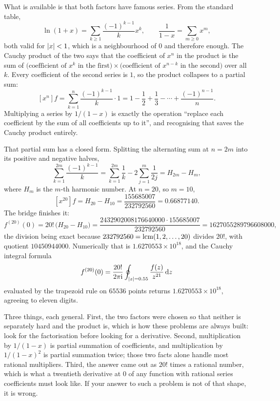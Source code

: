 What is available is that both factors have famous series. From the standard table,
\[
\ln(1+x)=\sum_{k\geq1}\frac{(-1)^{k-1}}{k}x^{k},\qquad \frac{1}{1-x}=\sum_{m\geq0}x^{m},
\]
both valid for $\left\lvert x\right\rvert<1$, which is a neighbourhood of $0$ and therefore enough. The Cauchy product of the two says that the coefficient of $x^{n}$ in the product is the sum of $\bigl(\text{coefficient of }x^{k}\text{ in the first}\bigr)\times\bigl(\text{coefficient of }x^{n-k}\text{ in the second}\bigr)$ over all $k$. Every coefficient of the second series is $1$, so the product collapses to a partial sum:
\[
[x^{n}]f=\sum_{k=1}^{n}\frac{(-1)^{k-1}}{k}\cdot1=1-\frac12+\frac13-\cdots+\frac{(-1)^{n-1}}{n} .
\]
Multiplying a series by $1/(1-x)$ is exactly the operation ``replace each coefficient by the sum of all coefficients up to it'', and recognising that saves the Cauchy product entirely.

That partial sum has a closed form. Splitting the alternating sum at $n=2m$ into its positive and negative halves,
\[
\sum_{k=1}^{2m}\frac{(-1)^{k-1}}{k}=\sum_{k=1}^{2m}\frac1k-2\sum_{j=1}^{m}\frac{1}{2j}=H_{2m}-H_{m},
\]
where $H_{m}$ is the $m$-th harmonic number. At $n=20$, so $m=10$,
\[
[x^{20}]f=H_{20}-H_{10}=\frac{155685007}{232792560}=0.66877140 .
\]
The bridge finishes it:
\[
f^{(20)}(0)=20!\,\bigl(H_{20}-H_{10}\bigr)=\frac{2432902008176640000\cdot155685007}{232792560}=1627055289796608000 ,
\]
the division being exact because $232792560=\operatorname{lcm}(1,2,\dots,20)$ divides $20!$, with quotient $10450944000$. Numerically that is $1.6270553\times10^{18}$, and the Cauchy integral formula
\[
f^{(20)}(0)=\frac{20!}{2\pi\mathrm{i}}\oint_{\left\lvert z\right\rvert=0.55}\frac{f(z)}{z^{21}}\,\mathrm{d} z
\]
evaluated by the trapezoid rule on $65536$ points returns $1.6270553\times10^{18}$, agreeing to eleven digits.

\begin{keynote}
Three things, each general. First, the two factors were chosen so that neither is separately hard and the product is, which is how these problems are always built: look for the factorisation before looking for a derivative. Second, multiplication by $1/(1-x)$ is partial summation of coefficients, and multiplication by $1/(1-x)^{2}$ is partial summation twice; those two facts alone handle most rational multipliers. Third, the answer came out as $20!$ times a rational number, which is what a twentieth derivative at $0$ of any function with rational series coefficients must look like. If your answer to such a problem is not of that shape, it is wrong.
\end{keynote}

